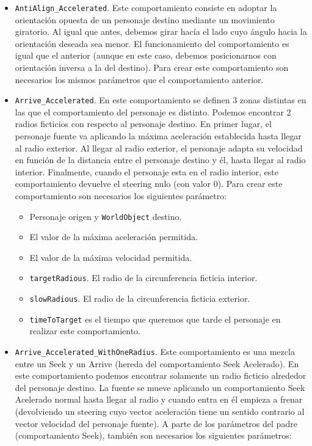\begin{itemize}
 \item \texttt{AntiAlign\_Accelerated}. Este comportamiento consiste en adoptar la orientación opuesta de un personaje destino mediante un movimiento giratorio. Al igual que antes, debemos girar hacía el lado cuyo ángulo hacia la orientación deseada sea menor. El funcionamiento del comportamiento es igual que el anterior (aunque en este caso, debemos posicionarnos con orientación inversa a la del destino). Para crear este comportamiento son necesarios los mismos parámetros que el comportamiento anterior.
 \item \texttt{Arrive\_Accelerated}. En este comportamiento se definen 3 zonas distintas en las que el comportamiento del personaje es distinto. Podemos encontrar 2 radios ficticios con respecto al personaje destino. En primer lugar, el personaje fuente va aplicando la máxima aceleración establecida hasta llegar al radio exterior. Al llegar al radio exterior, el personaje adapta su velocidad en función de la distancia entre el personaje destino y él, hasta llegar al radio interior. Finalmente, cuando el personaje esta en el radio interior, este comportamiento devuelve el steering nulo (con valor 0). Para crear este comportamiento son necesarios los siguientes parámetro:
 \begin{itemize}
 	\item Personaje origen y \texttt{WorldObject} destino.
 	\item El valor de la máxima aceleración permitida.
 	\item El valor de la máxima velocidad permitida.
 	\item \texttt{targetRadious}. El radio de la circunferencia ficticia interior.
 	\item \texttt{slowRadious}. El radio de la circunferencia ficticia exterior.
 	\item \texttt{timeToTarget} es el tiempo que queremos que tarde el personaje en realizar este comportamiento.
 \end{itemize}
 \item \texttt{Arrive\_Accelerated\_WithOneRadius}. Este comportamiento es una mezcla entre un Seek y un Arrive (hereda del comportamiento Seek Acelerado). En este comportamiento podemos encontrar solamente un radio ficticio alrededor del personaje destino. La fuente se mueve aplicando un comportamiento Seek Acelerado normal hasta llegar al radio y cuando entra en él empieza a frenar (devolviendo un steering cuyo vector aceleración tiene un sentido contrario al vector velocidad del personaje fuente). A parte de los parámetros del padre (comportamiento Seek), también son necesarios los siguientes parámetros:

\end{itemize}
